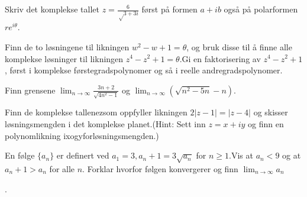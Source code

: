 \documentclass{assignment}
\begin{document}
\begin{problem}
Skriv det komplekse tallet $z=\frac{6}{√{3}+3i}$ først på formen $a+ib$ også på polarformen $re^{i\theta}$.
\end{problem}

\begin{answer}

\end{answer}


\begin{problem}
Finn de to løsningene til likningen $w^2 - w + 1 = \theta$, og bruk disse til å finne alle komplekse løsninger til likningen $z^4 - z^2 + 1 = \theta$.Gi en faktorisering av $z^4 - z^2 + 1$, først i komplekse førstegradspolynomer og så i reelle andregradspolynomer.
\end{problem}

\begin{answer}

\end{answer}


\begin{problem}
Finn grensene $\lim_{n \rightarrow \infty}\frac{3n + 2}{\sqrt{4n^2 - 1}}$ og $\lim_{n\rightarrow\infty}(\sqrt{n^2 - 5n} - n)$.
\end{problem}

\begin{answer}

\end{answer}


\begin{problem}
Finn de komplekse tallenezsom oppfyller likningen $2|z - 1|=|z - 4|$ og skisser løsningsmengden i det komplekse planet.(Hint: Sett inn $z=x+iy$ og finn en polynomlikning ixogyforløsningsmengden.)
\end{problem}

\begin{answer}

\end{answer}


\begin{problem}
En følge $\{ a_n \}$ er definert ved $a_1 = 3, a_n + 1 = 3\sqrt{a_n}$ for $n \geq 1$.Vis at $a_n < 9$ og at $a_n+1 > a_n$ for alle $n$. Forklar hvorfor følgen konvergerer og finn $\lim_{n \rightarrow \infty}{a_n}$
\end{problem}

\begin{answer}

\end{answer}.
\end{document}
